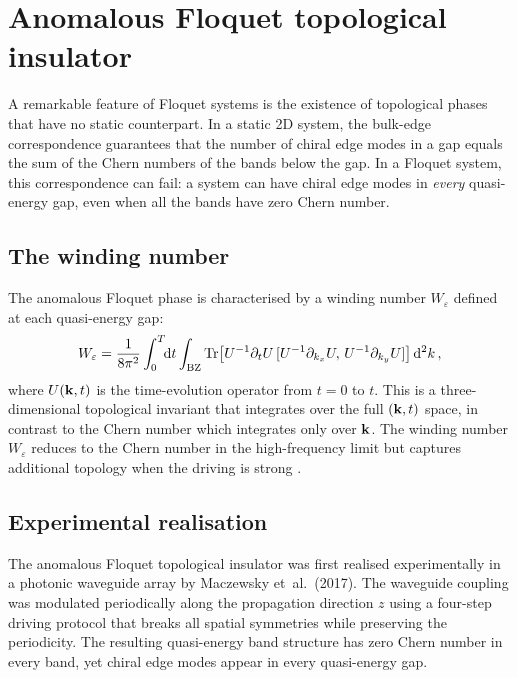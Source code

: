 \section{Anomalous Floquet topological insulator}
\label{sec:ch13-anomalous-floquet}

A remarkable feature of Floquet systems is the existence of topological
phases that have no static counterpart.  In a static 2D system, the
bulk-edge correspondence guarantees that the number of chiral edge
modes in a gap equals the sum of the Chern numbers of the bands below
the gap.  In a Floquet system, this correspondence can fail: a system
can have chiral edge modes in \emph{every} quasi-energy gap, even when
all the bands have zero Chern number.

\subsection{The winding number}
\label{sec:ch13-winding-number}

The anomalous Floquet phase is characterised by a winding number
$W_\varepsilon$ defined at each quasi-energy gap:
\begin{equation}\label{eq:ch13-winding-number}
  W_\varepsilon
  = \frac{1}{8\pi^2}\int_0^T\!\!\mathrm{d} t\int_{\mathrm{BZ}}
  \operatorname{Tr}\bigl[
  U^{-1}\partial_t U\,[U^{-1}\partial_{k_x}U,\,U^{-1}\partial_{k_y}U]
  \bigr]\,\mathrm{d}^2 k\,,
\end{equation}
where $U(\mathbf{k},t)$ is the time-evolution operator from $t=0$ to $t$.
This is a three-dimensional topological invariant that integrates over
the full $(\mathbf{k},t)$ space, in contrast to the Chern number which
integrates only over $\mathbf{k}$.  The winding number $W_\varepsilon$
reduces to the Chern number in the high-frequency limit but captures
additional topology when the driving is strong
\cite{kitagawa2010topological,ozawa2018topological}.

\subsection{Experimental realisation}
\label{sec:ch13-anomalous-expt}

The anomalous Floquet topological insulator was first realised
experimentally in a photonic waveguide array by Maczewsky et~al.\
(2017).  The waveguide coupling was modulated periodically along the
propagation direction $z$ using a four-step driving protocol that
breaks all spatial symmetries while preserving the periodicity.  The
resulting quasi-energy band structure has zero Chern number in every
band, yet chiral edge modes appear in every quasi-energy gap.


